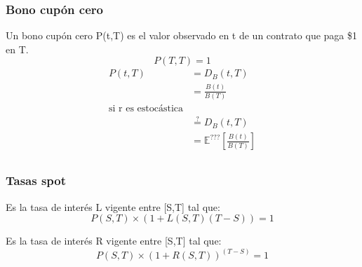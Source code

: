 
\begin{frame}
    \frametitle{Bono cupón cero}
    \begin{defin}
        Un bono cupón cero P(t,T) es el valor observado en t de un contrato que paga \$1 en T.
        \begin{equation*}
            P(T, T) = 1
        \end{equation*}
        \begin{align*}
            P(t, T) &= D_B(t,T) \\
            &= \frac{B(t)}{B(T)} \\
            \text{si r es estocástica}\\
            &\stackrel{?}{=} D_B(t,T) \\
              &= \mathbb{E}^{\text{???}}\left[\frac{B(t)}{B(T)}\right] \\
        \end{align*}
    \end{defin}
\end{frame}


\begin{frame}
    \frametitle{Tasas spot}
    \begin{defin}
        Es la tasa de interés L vigente entre [S,T] tal que:
        \begin{equation*}
            P(S,T) \times (1+L(S,T) (T-S)) = 1
        \end{equation*}
    \end{defin}
    \begin{defin}
        Es la tasa de interés R vigente entre [S,T] tal que:
        \begin{equation*}
            P(S,T) \times (1+R(S,T))^{(T-S)} = 1
        \end{equation*}
    \end{defin}
\end{frame}

